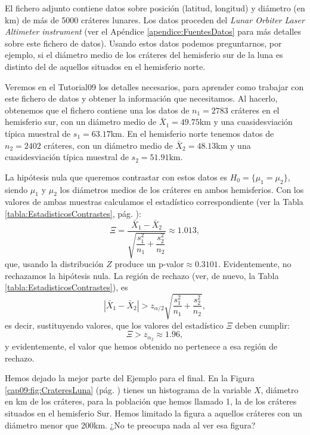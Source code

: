 \begin{ejemplo}
\label{cap09:ejem:CrateresLunares}
El fichero adjunto
 contiene
datos sobre posición (latitud, longitud) y diámetro (en km) de más de 5000 cráteres lunares. Los
datos proceden del {\em Lunar Orbiter Laser Altimeter instrument} (ver el Apéndice
\ref{apendice:FuentesDatos} para más detalles sobre este fichero de datos). Usando estos datos
podemos preguntarnos, por ejemplo, si el diámetro medio de los cráteres del hemisferio sur de la
luna es distinto del de aquellos situados en el hemisferio norte.

Veremos en el Tutorial09 los detalles necesarios, para aprender como trabajar con este fichero de
datos y obtener la información que necesitamos. Al hacerlo, obtenemos que el fichero contiene una
los datos de $n_1=2783$ cráteres en el hemisferio sur, con un diámetro medio de $\bar X_1=49.75$km
y una cuasidesviación típica muestral de $s_1=63.17$km. En el hemisferio norte tenemos datos de
$n_2=2402$ cráteres, con un diámetro medio de $\bar X_2=48.13$km y una cuasidesviación típica
muestral de $s_2=51.91$km.

La hipótesis nula que queremos contrastar con estos datos es $H_0=\{\mu_1=\mu_2\}$, siendo $\mu_1$
y $\mu_2$ los diámetros medios de los cráteres en ambos hemisferios. Con los valores de ambas
muestras calculamos el estadístico correspondiente (ver la Tabla
\ref{tabla:EstadisticosContrastes}, pág. \pageref{tabla:EstadisticosContrastes}):
\[\Xi=\dfrac{\bar X_1-\bar X_2}{\sqrt{\dfrac{s_1^2}{n_1}+\dfrac{s_2^2}{n_2}}}\approx 1.013,\]
que, usando la distribución $Z$ produce un p-valor$\approx 0.3101$. Evidentemente, no rechazamos la hipótesis nula. La región de rechazo (ver, de nuevo, la Tabla \ref{tabla:EstadisticosContrastes}), es
\[|\bar X_1-\bar X_2|>\displaystyle{z_{\alpha/2}}{\sqrt{\frac{s_1^2}{n_1}+\frac{s_2^2}{n_2}}},\]
es decir, sustituyendo valores, que los valores del estadístico $\Xi$ deben cumplir:
\[\Xi>z_{\alpha_2}\approx 1.96,\]
y evidentemente, el valor que hemos obtenido no pertenece a esa región de rechazo.

Hemos dejado la mejor parte del Ejemplo para el final. En la Figura \ref{cap09:fig:CrateresLuna}
(pág. \pageref{cap09:fig:CrateresLuna}) tienes un histograma de la variable $X$, diámetro en km de
los cráteres, para la población que hemos llamado 1, la de los cráteres situados en el hemisferio
Sur. Hemos limitado la figura a aquellos cráteres con un diámetro menor que 200km. ¿No te preocupa
nada al ver esa figura?


\end{ejemplo}

